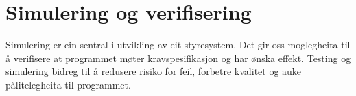 \chapter{Simulering og verifisering}
\thispagestyle{fancy}

Simulering er ein sentral i utvikling av eit styresystem.
Det gir oss moglegheita til å verifisere at programmet møter kravspesifikasjon og har ønska effekt.
Testing og simulering bidreg til å redusere risiko for feil, forbetre kvalitet og auke pålitelegheita til programmet.



